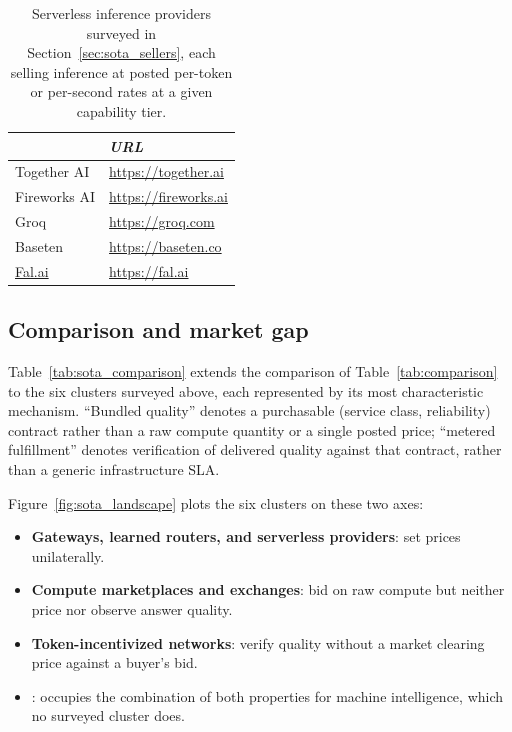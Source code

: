 \begin{samepage}
  \begin{table}[H]
    \centering
    \footnotesize
    \begin{tabular}{l|l|}
                & \emph{URL} \\
      \hline
      Together AI  & \url{https://together.ai} \\
      \hline
      Fireworks AI & \url{https://fireworks.ai} \\
      \hline
      Groq         & \url{https://groq.com} \\
      \hline
      Baseten      & \url{https://baseten.co} \\
      \hline
      \href{https://fal.ai}{Fal.ai}       & \url{https://fal.ai} \\
      \hline
    \end{tabular}
    \caption{Serverless inference providers surveyed in
      Section~\ref{sec:sota_sellers}, each selling inference at posted
      per-token or per-second rates at a given capability tier.}
    \label{tab:sota_sellers_companies}
  \end{table}
\end{samepage}

\subsection{Comparison and market gap}
\label{sec:sota_gap}

Table~\ref{tab:sota_comparison} extends the comparison of
Table~\ref{tab:comparison} to the six clusters surveyed above, each
represented by its most characteristic mechanism. ``Bundled quality''
denotes a purchasable (service class, reliability) contract rather
than a raw compute quantity or a single posted price; ``metered
fulfillment'' denotes verification of delivered quality against that
contract, rather than a generic infrastructure SLA.

Figure~\ref{fig:sota_landscape} plots the six clusters on these two
axes:

\begin{itemize}
  \item \textbf{Gateways, learned routers, and serverless providers}: set
    prices unilaterally.
  \item \textbf{Compute marketplaces and exchanges}: bid on raw compute but
    neither price nor observe answer quality.
  \item \textbf{Token-incentivized networks}: verify quality without a market
    clearing price against a buyer's bid.
  \item \textbf{\Noesis{}}: occupies the combination of both properties for
    machine intelligence, which no surveyed cluster does.
\end{itemize}

